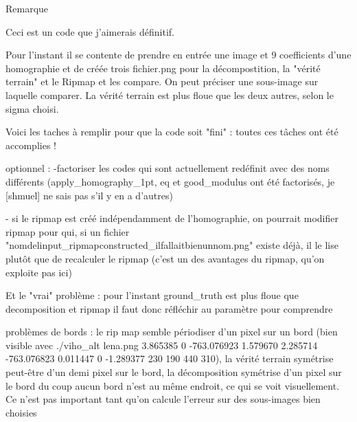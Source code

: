 Remarque

Ceci est un code que j’aimerais définitif.

Pour l'instant il se contente de prendre en entrée une image et 9 coefficients d'une homographie et de créée trois fichier.png pour la décompostition, la "vérité terrain" et le Ripmap et les compare. On peut préciser une sous-image sur laquelle comparer.
La vérité terrain est plus floue que les deux autres, selon le sigma choisi.



Voici les taches à remplir pour que la code soit "fini" :
	toutes ces tâches ont été accomplies !
	
	
	
optionnel :
	-factoriser les codes qui sont actuellement redéfinit avec des noms différents (apply_homography_1pt, eq et good_modulus ont été factorisés, je [shmuel] ne sais pas s'il y en a d'autres)
	
	- si le ripmap est créé indépendamment de l'homographie, on pourrait modifier ripmap pour qui, si un fichier "nomdelinput_ripmapconstructed_ilfallaitbienunnom.png" existe déjà, il le lise plutôt que de recalculer le ripmap (c'est un des avantages du ripmap, qu'on exploite pas ici)
	
	
	
Et le "vrai" problème :
	pour l'instant ground_truth est plus floue que decomposition et ripmap
	il faut donc réfléchir au paramètre pour comprendre

problèmes de bords :
	le rip map semble périodiser d'un pixel sur un bord (bien visible avec ./viho_alt lena.png 3.865385 0 -763.076923 1.579670 2.285714 -763.076823 0.011447 0 -1.289377 230 190 440 310), la vérité terrain symétrise peut-être d'un demi pixel sur le bord, la décomposition symétrise d'un pixel sur le bord
	du coup aucun bord n'est au même endroit, ce qui se voit visuellement. Ce n'est pas important tant qu'on calcule l'erreur sur des sous-images bien choisies
